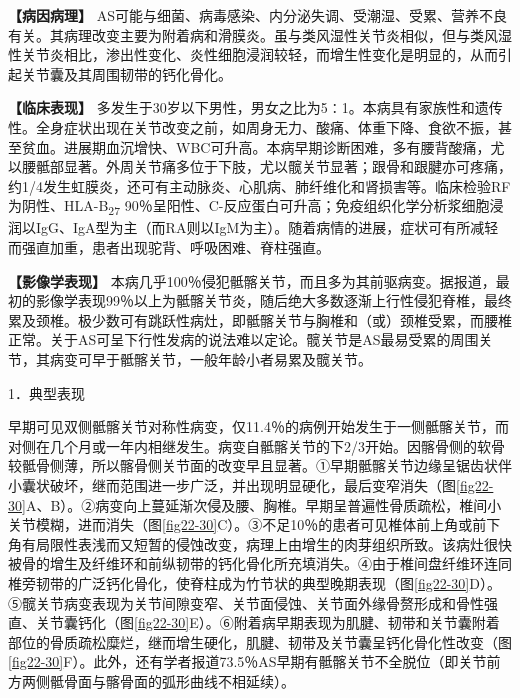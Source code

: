 \textbf{【病因病理】}
AS可能与细菌、病毒感染、内分泌失调、受潮湿、受累、营养不良有关。其病理改变主要为附着病和滑膜炎。虽与类风湿性关节炎相似，但与类风湿性关节炎相比，渗出性变化、炎性细胞浸润较轻，而增生性变化是明显的，从而引起关节囊及其周围韧带的钙化骨化。

\textbf{【临床表现】}
多发生于30岁以下男性，男女之比为5∶1。本病具有家族性和遗传性。全身症状出现在关节改变之前，如周身无力、酸痛、体重下降、食欲不振，甚至贫血。进展期血沉增快、WBC可升高。本病早期诊断困难，多有腰背酸痛，尤以腰骶部显著。外周关节痛多位于下肢，尤以髋关节显著；跟骨和跟腱亦可疼痛，约1/4发生虹膜炎，还可有主动脉炎、心肌病、肺纤维化和肾损害等。临床检验RF为阴性、HLA-B\textsubscript{27}
90％呈阳性、C-反应蛋白可升高；免疫组织化学分析浆细胞浸润以IgG、IgA型为主（而RA则以IgM为主）。随着病情的进展，症状可有所减轻而强直加重，患者出现驼背、呼吸困难、脊柱强直。

\textbf{【影像学表现】}
本病几乎100％侵犯骶髂关节，而且多为其前驱病变。据报道，最初的影像学表现99％以上为骶髂关节炎，随后绝大多数逐渐上行性侵犯脊椎，最终累及颈椎。极少数可有跳跃性病灶，即骶髂关节与胸椎和（或）颈椎受累，而腰椎正常。关于AS可呈下行性发病的说法难以定论。髋关节是AS最易受累的周围关节，其病变可早于骶髂关节，一般年龄小者易累及髋关节。

1．典型表现

早期可见双侧骶髂关节对称性病变，仅11.4％的病例开始发生于一侧骶髂关节，而对侧在几个月或一年内相继发生。病变自骶髂关节的下2/3开始。因髂骨侧的软骨较骶骨侧薄，所以髂骨侧关节面的改变早且显著。①早期骶髂关节边缘呈锯齿状伴小囊状破坏，继而范围进一步广泛，并出现明显硬化，最后变窄消失（图\ref{fig22-30}A、B）。②病变向上蔓延渐次侵及腰、胸椎。早期呈普遍性骨质疏松，椎间小关节模糊，进而消失（图\ref{fig22-30}C）。③不足10％的患者可见椎体前上角或前下角有局限性表浅而又短暂的侵蚀改变，病理上由增生的肉芽组织所致。该病灶很快被骨的增生及纤维环和前纵韧带的钙化骨化所充填消失。④由于椎间盘纤维环连同椎旁韧带的广泛钙化骨化，使脊柱成为竹节状的典型晚期表现（图\ref{fig22-30}D）。⑤髋关节病变表现为关节间隙变窄、关节面侵蚀、关节面外缘骨赘形成和骨性强直、关节囊钙化（图\ref{fig22-30}E）。⑥附着病早期表现为肌腱、韧带和关节囊附着部位的骨质疏松糜烂，继而增生硬化，肌腱、韧带及关节囊呈钙化骨化性改变（图\ref{fig22-30}F）。此外，还有学者报道73.5％AS早期有骶髂关节不全脱位（即关节前方两侧骶骨面与髂骨面的弧形曲线不相延续）。

